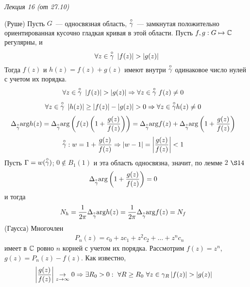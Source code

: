 \begin{flushright}
    \textit{Лекция 16 (от 27.10)}
\end{flushright}
\theorem (Руше)
Пусть $G$~--- односвязная область, $\overset{\circ}{\gamma}$~--- замкнутая положительно
ориентированная кусочно гладкая кривая в этой области. Пусть $f,g: G \mapsto
\mathbb{C}$ регулярны, и
\begin{equation}\label{(20.3)}
    \forall z \in \overset{\circ}{\gamma} \ \left| f(z) \right| > \left| g(z) \right|
\end{equation}
Тогда $f(z)$ и $h(z) = f(z)+g(z)$ имеют внутри $\overset{\circ}{\gamma}$ одинаковое число нулей
с учетом их порядка.
\pr
\begin{align*}
  & \forall z \in \overset{\circ}{\gamma} \ \left| f(z) \right| > \left| g(z) \right| \Rightarrow \forall z \in \overset{\circ}{\gamma} \ f(z) \neq 0
\end{align*}
\begin{align*}
  & \forall z \in \overset{\circ}{\gamma} \ \left| h(z) \right|\geq \left| f(z) \right| - \left| g(z) \right| > 0 \Rightarrow \forall z \in \overset{\circ}{\gamma} h(z) \neq 0
\end{align*}
\begin{align*}
  & \Delta_{\overset{\circ}{\gamma}}\mathrm{arg} h(z) = \Delta_{\overset{\circ}{\gamma}} \mathrm{arg} \left( f(z)\left( 1+\frac{g(z)}{f(z)} \right) \right) = \Delta_{\overset{\circ}{\gamma}}\mathrm{arg} f(z) +\Delta_{\overset{\circ}{\gamma}}\mathrm{arg} \left( 1+\frac{g(z)}{f(z)} \right)
\end{align*}
\begin{align*}
  & \overset{\circ}{\gamma}: w = 1 + \frac{g(z)}{f(z)} \Rightarrow \left| w-1 \right| = \left| \frac{g(z)}{f(z)} \right| < 1
\end{align*}
Пусть $\Gamma = w(\overset{\circ}{\gamma})$; $0 \not \in B_1(1)$ и эта область односвязна,
значит, по лемме $2$ $\S 14$
\begin{align*}
  & \Delta_{\overset{\circ}{\gamma}}\mathrm{arg} \left( 1+\frac{g(z)}{f(z)} \right) = 0
\end{align*}
и тогда
\begin{align*}
  & N_h = \frac{1}{2\pi}\Delta_{\overset{\circ}{\gamma}}\mathrm{arg} h(z) = \frac{1}{2\pi}\Delta_{\overset{\circ}{\gamma}}\mathrm{arg} f(z) = N_f
\end{align*}
\theorem (Гаусса)
Многочлен
\begin{align*}
  & P_n(z) = c_0+zc_1+z^2c_2+\dots+z^nc_n
\end{align*}
имеет в $\mathbb{C}$ ровно $n$ корней с учетом их порядка.
\pr
Рассмотрим $f(z) = z^n$, $g(z) = P_n(z) - f(z)$. Как известно,
\begin{align*}
  & \left| \frac{g(z)}{f(z)} \right| \underset{z \to \infty}{\to} 0 \Rightarrow \exists R_0 > 0: \ \forall R \geq R_0 \ \forall z \in \gamma_R \left| f(z) \right| > \left| g(z) \right|
\end{align*}
